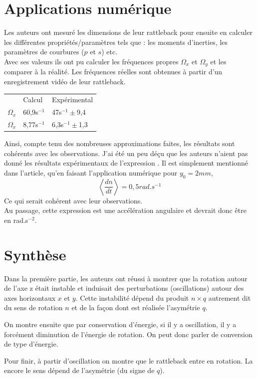 \documentclass[12pt,a4paper]{article}
\makeatletter
\renewcommand*{\eqref}[1]{%
	\hyperref[{#1}]{\textup{\tagform@{\ref*{#1}}}}%
}
\makeatother
\begin{document}
	\section{Applications numérique}
	Les auteurs ont mesuré les dimensions de leur rattleback pour ensuite en calculer les différentes propriétés/paramètres tels que : les moments d'inerties, les paramètres de courbures ($p$ et $s$) etc.\\
	Avec ses valeurs ils ont pu calculer les fréquences propres $\Omega_x$ et $\Omega_y$ et les comparer à la réalité. Les fréquences réelles sont obtenues à partir d'un enregistrement vidéo de leur rattleback.

	\begin{center}
		\begin{tabular}{lll}
		&	Calcul	&Expérimental\\[4pt]
		$\Omega_x$		&	60,9s$^{-1}$	&47s$^{-1}\pm$9,4\\
		$\Omega_x$		&	8,77s$^{-1}$	&6,3s$^{-1}\pm$1,3
		\end{tabular}
	\end{center}
	Ainsi, compte tenu des nombreuses approximations faites, les résultats sont cohérents avec les observations.
	J'ai été un peu déçu que les auteurs n'aient pas donné les résultats expérimentaux de l'expression \eqref{eq:moyenne-rot}. Il est simplement mentionné dans l'article, qu'en faisant l'application numérique pour $y_0=2mm$,
	$$\left<\dfrac{dn}{dt}\right>=0,5rad.s^{-1}$$
	Ce qui serait cohérent avec leur observations.\\
	Au passage, cette expression est une accélération angulaire et devrait donc être en rad.s$^{-2}$.
	\section{Synthèse}
	
	Dans la première partie, les auteurs ont réussi à montrer que la rotation autour de l'axe z était instable et induisait des perturbations (oscillations) autour des axes horizontaux $x$ et $y$. Cette instabilité dépend du produit $n\times q$ autrement dit du sens de rotation $n$ et de la façon dont est réalisée l'asymétrie $q$.
	
	On montre ensuite que par conservation d'énergie, si il y a oscillation, il y a forcément diminution de l'énergie de rotation. On peut donc parler de conversion de type d'énergie.
	
	Pour finir, à partir d'oscillation on montre que le rattleback entre en rotation. La encore le sens dépend de l'asymétrie (du signe de $q$).
	
\end{document}
